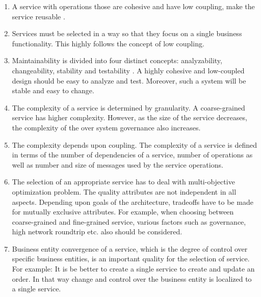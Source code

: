 {{{{{{{{{\begin{enumerate}
\item A service with operations those are cohesive and have low coupling, make the service reusable \cite{Washizakia:2003aa, Feuerlicht:2007aa, Ma:2009aa}.

\item Services must be selected in a way so that they focus on a single business functionality. This highly follows the concept of low coupling. \cite{Perepletchikov:2007aa, Sindhgatta:2015aa}

\item Maintainability is divided into four distinct concepts:  analyzability, changeability, stability and testability \cite{np:2001aa}. A highly cohesive and low-coupled design should be easy to analyze and test. Moreover,  such a system will be stable and easy to change. \cite{Perepletchikov:2007aa}


\item The complexity of a service is determined by granularity. A coarse-grained service has higher complexity. However, as the size of the service decreases, the complexity of the over system governance also increases.
\cite{Saad-Alahmari:2011aa}

\item The complexity depends upon coupling. The complexity of a service is defined in terms of the number of dependencies of a service, number of operations as well as number and size of messages used by the service operations. 
\\
\cite{Saad-Alahmari:2011aa, Sindhgatta:2015aa, Lee:2001aa}

\item The selection of an appropriate service has to deal with multi-objective optimization problem.  The quality attributes are not independent in all aspects. Depending upon goals of the architecture, tradeoffs have to be made for mutually exclusive attributes. For example, when choosing between coarse-grained and fine-grained service, various factors such as governance, high network roundtrip etc. also should be considered. 
 \cite{Jamshidi:2008aa}

\item Business entity convergence of a service, which is the degree of control over specific business entities, is an important quality for the selection of service. For example: It is be better to create a single service to create and update an order. In that way change and control over the business entity is localized to a single service. \cite{Ma:2009aa}


\end{enumerate}}}}}}}}}}
